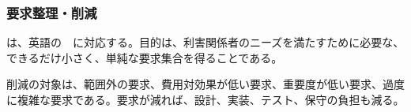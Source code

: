 \subsubsection{要求整理・削減}

は、英語の \,\, に対応する。目的は、利害関係者のニーズを満たすために必要な、できるだけ小さく、単純な要求集合を得ることである。

削減の対象は、範囲外の要求、費用対効果が低い要求、重要度が低い要求、過度に複雑な要求である。要求が減れば、設計、実装、テスト、保守の負担も減る。
